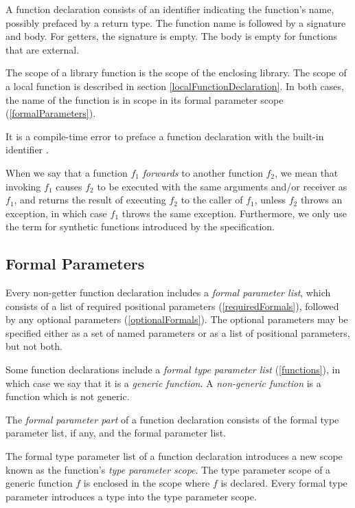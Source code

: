 \documentclass{article}
\begin{document}
\LMHash{}
A function declaration consists of an identifier indicating the function's name, possibly prefaced by a return type.
The function name is followed by a signature and body.
For getters, the signature is empty.
The body is empty for functions that are external.

\LMHash{}
The scope of a library function is the scope of the enclosing library.
The scope of a local function is described in section \ref{localFunctionDeclaration}.
In both cases, the name of the function is in scope in its formal parameter scope (\ref{formalParameters}).

\LMHash{}
It is a compile-time error to preface a function declaration with the built-in identifier \STATIC{}.

\LMHash{}
When we say that a function $f_1$ {\em forwards} to another function $f_2$, we mean that invoking $f_1$ causes $f_2$ to be executed with the same arguments and/or receiver as $f_1$, and returns the result of executing $f_2$ to the caller of $f_1$, unless $f_2$ throws an exception, in which case $f_1$ throws the same exception.
Furthermore, we only use the term for synthetic functions introduced by the specification.


\subsection{Formal Parameters}

\LMHash{}
Every non-getter function declaration includes a {\em formal parameter list},
which consists of a list of required positional parameters (\ref{requiredFormals}),
followed by any optional parameters (\ref{optionalFormals}).
The optional parameters may be specified either as a set of named parameters or as a list of positional parameters, but not both.

\LMHash{}
Some function declarations include a {\em formal type parameter list} (\ref{functions}),
in which case we say that it is a {\em generic function}.
A {\em non-generic function} is a function which is not generic.

\LMHash{}
The {\em formal parameter part} of a function declaration consists of the formal type parameter list, if any, and the formal parameter list.


\LMHash{}
The formal type parameter list of a function declaration introduces a new scope known as the function's {\em type parameter scope}.
The type parameter scope of a generic function $f$ is enclosed in the scope where $f$ is declared.
Every formal type parameter introduces a type into the type parameter scope.
\end{document}
